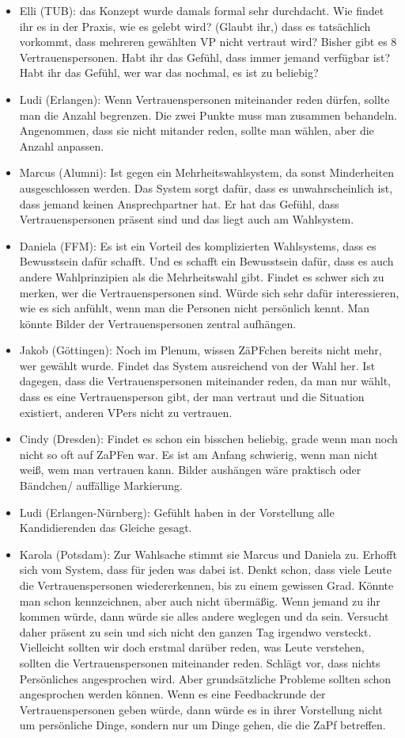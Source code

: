 \begin{itemize}
        \item Elli (TUB): das Konzept wurde damals formal sehr durchdacht. Wie findet ihr es in der Praxis, wie es gelebt wird? (Glaubt ihr,) dass es tatsächlich vorkommt, dass mehreren gewählten VP nicht vertraut wird? Bisher gibt es 8 Vertrauenspersonen. Habt ihr das Gefühl, dass immer jemand verfügbar ist? Habt ihr das Gefühl, wer war das nochmal, es ist zu beliebig?
        \item Ludi (Erlangen): Wenn Vertrauenspersonen miteinander reden dürfen, sollte man die Anzahl begrenzen. Die zwei Punkte muss man zusammen behandeln. Angenommen, dass sie nicht mitander reden, sollte man wählen, aber die Anzahl anpassen.
        \item Marcus (Alumni): Ist gegen ein Mehrheitswahlsystem, da sonst Minderheiten ausgeschlossen werden. Das System sorgt dafür, dass es unwahrscheinlich ist, dass jemand keinen Ansprechpartner hat. Er hat das Gefühl, dass Vertrauenspersonen präsent sind und das liegt auch am Wahlsystem.
        \item Daniela (FFM): Es ist ein Vorteil des komplizierten Wahlsystems, dass es Bewusstsein dafür schafft. Und es schafft ein Bewusstsein dafür, dass es auch andere Wahlprinzipien als die Mehrheitswahl gibt. Findet es schwer sich zu merken, wer die Vertrauenspersonen sind. Würde sich sehr dafür interessieren, wie es sich anfühlt, wenn man die Personen nicht persönlich kennt. Man könnte Bilder der Vertrauenspersonen zentral aufhängen.
        \item Jakob (Göttingen): Noch im Plenum, wissen ZäPFchen bereits nicht mehr, wer gewählt wurde. Findet das System ausreichend von der Wahl her. Ist dagegen, dass die Vertrauenspersonen miteinander reden, da man nur wählt, dass es eine Vertrauensperson gibt, der man vertraut und die Situation existiert, anderen VPers nicht zu vertrauen.
        \item Cindy (Dresden): Findet es schon ein bisschen beliebig, grade wenn man noch nicht so oft auf ZaPFen war. Es ist am Anfang schwierig, wenn man nicht weiß, wem man vertrauen kann. Bilder aushängen wäre praktisch oder Bändchen/ auffällige Markierung.
        \item Ludi (Erlangen-Nürnberg): Gefühlt haben in der Vorstellung alle Kandidierenden das Gleiche gesagt.
        \item Karola (Potsdam): Zur Wahlsache stimmt sie Marcus und Daniela zu. Erhofft sich vom System, dass für jeden was dabei ist. Denkt schon, dass viele Leute die Vertrauenspersonen wiedererkennen, bis zu einem gewissen Grad. Könnte man schon kennzeichnen, aber auch nicht übermäßig. Wenn jemand zu ihr kommen würde, dann würde sie alles andere weglegen und da sein. Versucht daher präsent zu sein und sich nicht den ganzen Tag irgendwo versteckt. Vielleicht sollten wir doch erstmal darüber reden, was Leute verstehen, sollten die Vertrauenspersonen miteinander reden. Schlägt vor, dass nichts Persönliches angesprochen wird. Aber grundsätzliche Probleme sollten schon angesprochen werden können. Wenn es eine Feedbackrunde der Vertrauenspersonen geben würde, dann würde es in ihrer Vorstellung nicht um persönliche Dinge, sondern nur um Dinge gehen, die die ZaPf betreffen.

\end{itemize}
